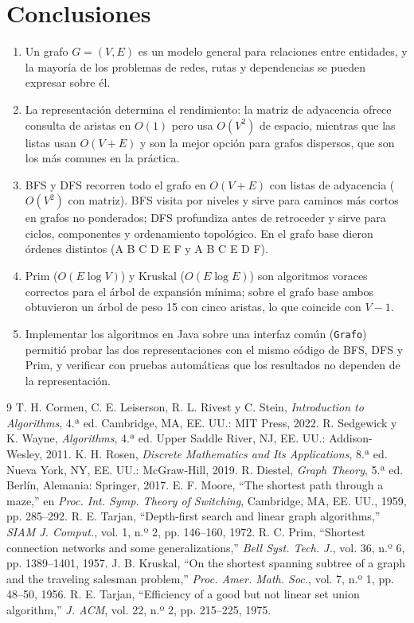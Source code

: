 \documentclass[conference]{IEEEtran}
\begin{document}
\section{Conclusiones}
\begin{enumerate}
  \item Un grafo $G=(V,E)$ es un modelo general para relaciones entre entidades, y la mayoría de los problemas de redes, rutas y dependencias se pueden expresar sobre él.
  \item La representación determina el rendimiento: la matriz de adyacencia ofrece consulta de aristas en $O(1)$ pero usa $O(V^2)$ de espacio, mientras que las listas usan $O(V+E)$ y son la mejor opción para grafos dispersos, que son los más comunes en la práctica.
  \item BFS y DFS recorren todo el grafo en $O(V+E)$ con listas de adyacencia ($O(V^2)$ con matriz). BFS visita por niveles y sirve para caminos más cortos en grafos no ponderados; DFS profundiza antes de retroceder y sirve para ciclos, componentes y ordenamiento topológico. En el grafo base dieron órdenes distintos (A B C D E F y A B C E D F).
  \item Prim ($O(E\log V)$) y Kruskal ($O(E\log E)$) son algoritmos voraces correctos para el árbol de expansión mínima; sobre el grafo base ambos obtuvieron un árbol de peso 15 con cinco aristas, lo que coincide con $V-1$.
  \item Implementar los algoritmos en Java sobre una interfaz común (\texttt{Grafo}) permitió probar las dos representaciones con el mismo código de BFS, DFS y Prim, y verificar con pruebas automáticas que los resultados no dependen de la representación.
\end{enumerate}

\begin{thebibliography}{9}
 T. H. Cormen, C. E. Leiserson, R. L. Rivest y C. Stein, \emph{Introduction to Algorithms}, 4.ª ed. Cambridge, MA, EE. UU.: MIT Press, 2022.
 R. Sedgewick y K. Wayne, \emph{Algorithms}, 4.ª ed. Upper Saddle River, NJ, EE. UU.: Addison-Wesley, 2011.
 K. H. Rosen, \emph{Discrete Mathematics and Its Applications}, 8.ª ed. Nueva York, NY, EE. UU.: McGraw-Hill, 2019.
 R. Diestel, \emph{Graph Theory}, 5.ª ed. Berlín, Alemania: Springer, 2017.
 E. F. Moore, ``The shortest path through a maze,'' en \emph{Proc. Int. Symp. Theory of Switching}, Cambridge, MA, EE. UU., 1959, pp. 285--292.
 R. E. Tarjan, ``Depth-first search and linear graph algorithms,'' \emph{SIAM J. Comput.}, vol. 1, n.º 2, pp. 146--160, 1972.
 R. C. Prim, ``Shortest connection networks and some generalizations,'' \emph{Bell Syst. Tech. J.}, vol. 36, n.º 6, pp. 1389--1401, 1957.
 J. B. Kruskal, ``On the shortest spanning subtree of a graph and the traveling salesman problem,'' \emph{Proc. Amer. Math. Soc.}, vol. 7, n.º 1, pp. 48--50, 1956.
 R. E. Tarjan, ``Efficiency of a good but not linear set union algorithm,'' \emph{J. ACM}, vol. 22, n.º 2, pp. 215--225, 1975.
\end{thebibliography}
\end{document}

